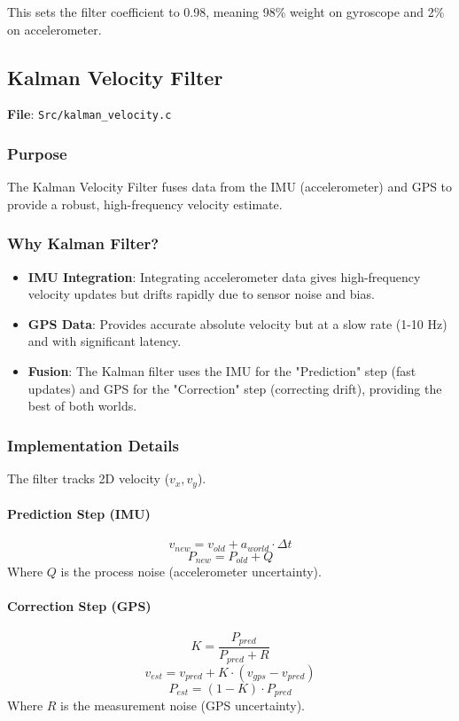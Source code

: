 \documentclass[11pt,a4paper]{article}
\begin{document}
This sets the filter coefficient to 0.98, meaning 98\% weight on gyroscope and 2\% on accelerometer.

\subsection{Kalman Velocity Filter}
\textbf{File}: \texttt{Src/kalman\_velocity.c}

\subsubsection{Purpose}
The Kalman Velocity Filter fuses data from the IMU (accelerometer) and GPS to provide a robust, high-frequency velocity estimate.

\subsubsection{Why Kalman Filter?}
\begin{itemize}
    \item \textbf{IMU Integration}: Integrating accelerometer data gives high-frequency velocity updates but drifts rapidly due to sensor noise and bias.
    \item \textbf{GPS Data}: Provides accurate absolute velocity but at a slow rate (1-10 Hz) and with significant latency.
    \item \textbf{Fusion}: The Kalman filter uses the IMU for the "Prediction" step (fast updates) and GPS for the "Correction" step (correcting drift), providing the best of both worlds.
\end{itemize}

\subsubsection{Implementation Details}
The filter tracks 2D velocity ($v_x, v_y$).

\paragraph{Prediction Step (IMU)}
\begin{equation}
v_{new} = v_{old} + a_{world} \cdot \Delta t
\end{equation}
\begin{equation}
P_{new} = P_{old} + Q
\end{equation}
Where $Q$ is the process noise (accelerometer uncertainty).

\paragraph{Correction Step (GPS)}
\begin{equation}
K = \frac{P_{pred}}{P_{pred} + R}
\end{equation}
\begin{equation}
v_{est} = v_{pred} + K \cdot (v_{gps} - v_{pred})
\end{equation}
\begin{equation}
P_{est} = (1 - K) \cdot P_{pred}
\end{equation}
Where $R$ is the measurement noise (GPS uncertainty).
\end{document}
